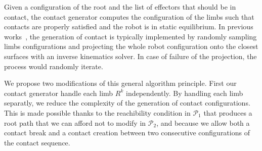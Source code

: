 Given a configuration of the root and the list of effectors that should be in contact, the contact generator computes the configuration of the limbs such that contacts are properly satisfied and the robot is in static equilibrium.
In previous works~\cite{DBLP:conf/iser/EscandeKMG08,Bouyarmane2009}, the generation of contact is typically implemented by randomly sampling limbs configurations and projecting the whole robot configuration onto the closest surfaces with an inverse kinematics solver.
In case of failure of the projection, the process would randomly iterate.

We propose two modifications of this general algorithm principle.
First our contact generator handle each limb $R^k$ independently.
By handling each limb separatly, we reduce the complexity of the generation of contact configurations.
This is made possible thanks to the reachibility condition in $\mathcal{P}_1$ that produces a root path that we can afford not to modify in $\mathcal{P}_2$, and because we allow both a contact break and a contact creation between two consecutive configurations of the contact sequence.
%
%
%
%
